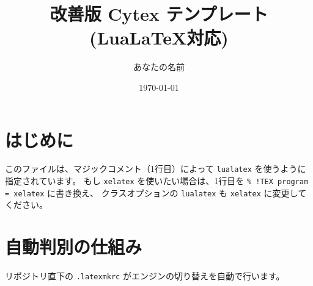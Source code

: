 \documentclass[lualatex,ja=standard]{bxjsarticle}
\begin{document}
\title{改善版 Cytex テンプレート (LuaLaTeX対応)}
\author{あなたの名前}
\date{\today}
\maketitle

\section{はじめに}
このファイルは、マジックコメント（1行目）によって \texttt{lualatex} を使うように指定されています。
もし \texttt{xelatex} を使いたい場合は、1行目を \texttt{\% !TEX program = xelatex} に書き換え、
クラスオプションの \texttt{lualatex} も \texttt{xelatex} に変更してください。

\section{自動判別の仕組み}
リポジトリ直下の \texttt{.latexmkrc} がエンジンの切り替えを自動で行います。
\end{document}
